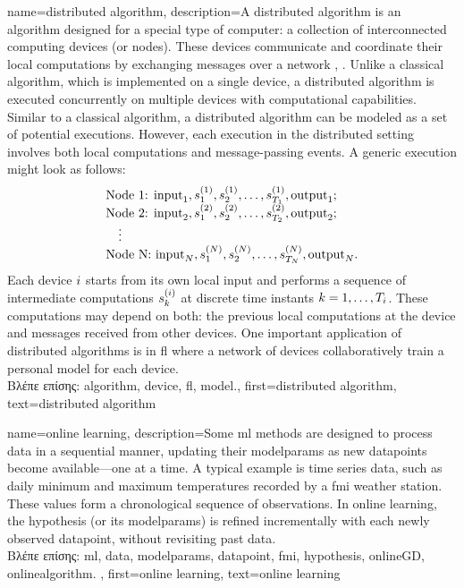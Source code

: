 {name={distributed algorithm},
	description={A distributed \gls{algorithm} is an \gls{algorithm} designed for 
		a special type of computer: a collection of interconnected computing devices (or nodes). 
		These devices communicate and coordinate their local computations by exchanging 
		messages over a network \cite{IntroDistAlg}, \cite{ParallelDistrBook}. Unlike a classical \gls{algorithm}, 
		which is implemented on a single \gls{device}, a distributed \gls{algorithm} is 
		executed concurrently on multiple \gls{device}s with computational capabilities. 
		Similar to a classical \gls{algorithm}, a distributed \gls{algorithm} can be modeled as a 
		set of potential executions. However, each execution in the distributed setting involves 
		both local computations and message-passing events. A generic execution might look as 
		follows:
		\[
		\begin{array}{l}
			\text{Node 1: } {\rm input}_1, s_1^{(1)}, s_2^{(1)}, \ldots, s_{T_1}^{(1)}, {\rm output}_1; \\
			\text{Node 2: } {\rm input}_2, s_1^{(2)}, s_2^{(2)}, \ldots, s_{T_2}^{(2)}, {\rm output}_2; \\
			\quad \vdots \\
			\text{Node N: } {\rm input}_N, s_1^{(N)}, s_2^{(N)}, \ldots, s_{T_N}^{(N)}, {\rm output}_N.
		\end{array}
		\]
		Each \gls{device} $i$ starts from its own local input and performs a sequence of 
		intermediate computations $s_{k}^{(i)}$ at discrete time instants $k = 1, \dots, T_i$. 
		These computations may depend on both: the previous local computations at the \gls{device} 
		and messages received from other \gls{device}s. One important application of distributed 
		\gls{algorithm}s is in \gls{fl} where a network of \gls{device}s collaboratively train a personal \gls{model} 
		for each \gls{device}.\\
		\foreignlanguage{greek}{Βλέπε επίσης:} \gls{algorithm}, \gls{device}, \gls{fl}, \gls{model}.},
	first={distributed algorithm}, 
	text={distributed algorithm}
}

{name={online learning},
	description={Some \gls{ml} methods  are designed to process \gls{data} in a sequential 
		manner, updating their \gls{modelparams} as new \gls{datapoint}s become available—one at a time. 
		A typical example is time series data, such as daily \gls{minimum} and \gls{maximum} temperatures 
		recorded by a \gls{fmi} weather station. These values form a chronological sequence 
		of observations. In online learning, the \gls{hypothesis} (or its \gls{modelparams}) is refined 
		incrementally with each newly observed \gls{datapoint}, without revisiting past \gls{data}.  \\ 
		\foreignlanguage{greek}{Βλέπε επίσης:} \gls{ml}, \gls{data}, \gls{modelparams}, \gls{datapoint}, 
		\gls{fmi}, \gls{hypothesis}, \gls{onlineGD}, \gls{onlinealgorithm}.  },
	first={online learning},
	text={online learning} 
}

